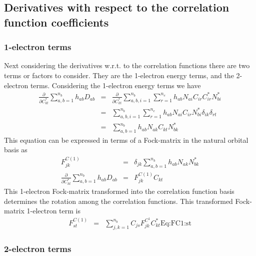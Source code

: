 \documentclass[pra,nofootinbib]{revtex4-1}
\newcommand{\dlabel}[1]{\text{#1}\label{#1}}
\begin{document}
\subsection{Derivatives with respect to the correlation function coefficients}

\subsubsection{1-electron terms}

Next considering the derivatives w.r.t. to the correlation functions there are
two terms or factors to consider. They are the 1-electron energy terms, and the
2-electron terms. Considering the 1-electron energy terms we
have
\begin{eqnarray}
  \frac{\partial}{\partial C^{*}_{kt}}\sum_{a,b=1}^{n_b}h_{ab}D_{ab}
  &=& \frac{\partial}{\partial C^{*}_{kt}}\sum_{a,b,i=1}^{n_b}\sum_{r=1}^{n_e}
      h_{ab}N_{ai}C_{ir}C^*_{ir}N^*_{bi} \\
  &=& \sum_{a,b,i=1}^{n_b}\sum_{r=1}^{n_e}
      h_{ab}N_{ai}C_{ir}N^*_{bi}\delta_{ik}\delta_{rt} \\
  &=& \sum_{a,b=1}^{n_b}
      h_{ab}N_{ak}C_{kt}N^*_{bk}
\end{eqnarray}
This equation can be expressed in terms of a Fock-matrix in the natural orbital 
basis as
\begin{eqnarray}
  F^{C(1)}_{jk}
  &=& \delta_{jk}\sum_{a,b=1}^{n_b}h_{ab}N_{ak}N^*_{bk}\\
  \frac{\partial}{\partial C^{*}_{kt}}\sum_{a,b=1}^{n_b}h_{ab}D_{ab}
  &=& F^{C(1)}_{jk}C_{kt}
\end{eqnarray}
This 1-electron Fock-matrix transformed into the correlation function basis
determines the rotation among the correlation functions. This transformed
Fock-matrix 1-electron term is
\begin{eqnarray}
  F^{C(1)}_{st}
  &=& \sum_{j,k=1}^{n_b} C_{js}F^{C^1}_{jk}C^*_{kt}
      \dlabel{Eq:FC1:st}
\end{eqnarray}

\subsubsection{2-electron terms}
\end{document}
